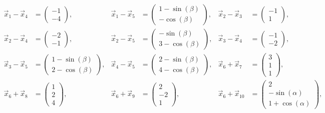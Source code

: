 \documentclass[11pt]{exam}
\begin{document}
\begin{questions}
\begin{solution}
\begin{align*}
	\end{align*}\begin{align*}
		\vec{x}_1-\vec{x}_4&=\left(\begin{array}{c}-1\\-4\end{array}\right),&
		\vec{x}_1-\vec{x}_5&=\left(\begin{array}{c}1-\sin(\beta)\\-\cos(\beta)\end{array}\right),&
		\vec{x}_2-\vec{x}_3&=\left(\begin{array}{c}-1\\1\end{array}\right),\\
		\vec{x}_2-\vec{x}_4&=\left(\begin{array}{c}-2\\-1\end{array}\right),&
		\vec{x}_2-\vec{x}_5&=\left(\begin{array}{c}-\sin(\beta)\\3-\cos(\beta)\end{array}\right),&
		\vec{x}_3-\vec{x}_4&=\left(\begin{array}{c}-1\\-2\end{array}\right),\\
		\vec{x}_3-\vec{x}_5&=\left(\begin{array}{c}1-\sin(\beta)\\2-\cos(\beta)\end{array}\right),&
		\vec{x}_4-\vec{x}_5&=\left(\begin{array}{c}2-\sin(\beta)\\4-\cos(\beta)\end{array}\right),&
		\vec{x}_6+\vec{x}_7&=\left(\begin{array}{c}3\\1\\1\end{array}\right),\\
		\vec{x}_6+\vec{x}_8&=\left(\begin{array}{c}1\\2\\4\end{array}\right),&
		\vec{x}_6+\vec{x}_9&=\left(\begin{array}{c}2\\-2\\1\end{array}\right),&
		\vec{x}_6+\vec{x}_{10}&=\left(\begin{array}{c}2\\-\sin(\alpha)\\1+\cos(\alpha)\end{array}\right),\\

\end{align*}
\end{solution}
\end{questions}
\end{document}
